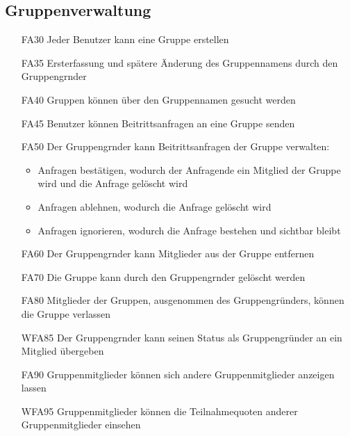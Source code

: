 \documentclass{scrartcl}
\begin{document}
	\subsection{Gruppenverwaltung}
	\begin{itemize}
		\item[FA30] Jeder Benutzer kann eine Gruppe erstellen
		\item[FA35] Ersterfassung und spätere Änderung des Gruppennamens durch den \gls{Gruppengrnder}
		\item[FA40] Gruppen können über den Gruppennamen gesucht werden
		\item[FA45] Benutzer können Beitrittsanfragen an eine Gruppe senden
		\item[FA50] Der \gls{Gruppengrnder} kann Beitrittsanfragen der Gruppe verwalten:
		\begin{itemize}
			\item Anfragen bestätigen, wodurch der Anfragende ein \gls{Mitglied} der Gruppe wird und die Anfrage gelöscht wird
		\end{itemize}
		\begin{itemize}
			\item Anfragen ablehnen, wodurch die Anfrage gelöscht wird
		\end{itemize}
		\begin{itemize}
			\item Anfragen ignorieren, wodurch die Anfrage bestehen und sichtbar bleibt
		\end{itemize}
		\item[FA60] Der \gls{Gruppengrnder} kann Mitglieder aus der Gruppe entfernen
		\item[FA70] Die Gruppe kann durch den \gls{Gruppengrnder} gelöscht werden
		\item[FA80] Mitglieder der Gruppen, ausgenommen des Gruppengründers, können die Gruppe verlassen
		\item[WFA85] Der \gls{Gruppengrnder} kann seinen Status als Gruppengründer an ein \gls{Mitglied} übergeben
		\item[FA90] Gruppenmitglieder können sich andere Gruppenmitglieder anzeigen lassen
		\item[WFA95] Gruppenmitglieder können die Teilnahmequoten anderer Gruppenmitglieder einsehen
		
	\end{itemize}
	
\end{document}
